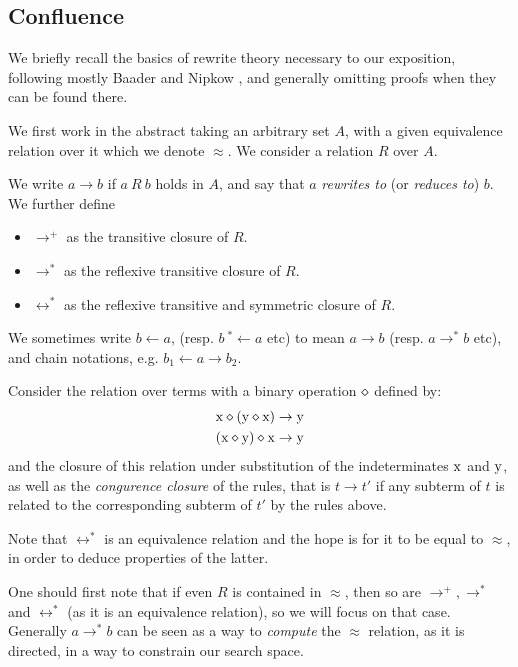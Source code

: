 \subsection{Confluence}\label{confluence-sec}

We briefly recall the basics of rewrite theory necessary to our exposition, following mostly Baader and Nipkow \cite{term-rewriting}, and generally omitting proofs when they can be found there.

We first work in the abstract taking an arbitrary set $A$, with a given equivalence relation over it which we denote $\approx$. We consider a relation $R$ over $A$.

\begin{definition}
  We write $a \rightarrow b$ if $a\ R\ b$ holds in $A$, and say that $a$ \emph{rewrites to} (or \emph{reduces to}) $b$. We further define
  \begin{itemize}
    \item $\rightarrow^+$ as the transitive closure of $R$.
    \item $\rightarrow^*$ as the reflexive transitive closure of $R$.
    \item $\leftrightarrow^*$ as the reflexive transitive and symmetric closure of $R$.
  \end{itemize}
  We sometimes write $b\leftarrow a$, (resp. $b\ {}^*\leftarrow a$ etc) to mean $a\rightarrow b$ (resp. $a\rightarrow^*b$ etc), and chain notations, e.g. $b_1\leftarrow a\rightarrow b_2$.
\end{definition}

\begin{example}\label{ex:group-trs}
  Consider the relation over terms with a binary operation $\diamond$ defined by:
  \begin{align*}
    \mathrm{x} \diamond (\mathrm{y} \diamond \mathrm{x}) &\rightarrow \mathrm{y}\\
    (\mathrm{x}\diamond \mathrm{y})\diamond  \mathrm{x} &\rightarrow \mathrm{y}
  \end{align*}
  and the closure of this relation under substitution of the indeterminates $\mathrm{x}$ and $\mathrm{y}$, as well as the \emph{congurence closure} of the rules, that is $t\rightarrow t'$ if any subterm of $t$ is related to the corresponding subterm of $t'$ by the rules above.
\end{example}


Note that $\leftrightarrow^*$ is an equivalence relation and the hope is for it to be equal to $\approx$, in order to deduce properties of the latter.

One should first note that if even $R$ is contained in $\approx$, then so are $\rightarrow^+, \rightarrow^*$ and $\leftrightarrow^*$ (as it is an equivalence relation), so we will focus on that case. Generally $a \rightarrow^* b$ can be seen as a way to \emph{compute} the $\approx$ relation, as it is directed, in a way to constrain our search space.

